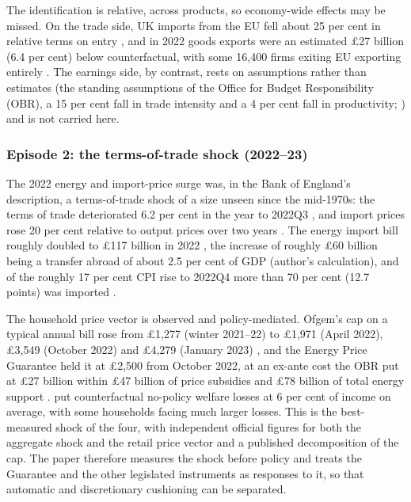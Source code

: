 The identification is relative, across products, so economy-wide
effects may be missed. On the trade side, UK imports from the EU fell
about 25 per cent in relative terms on entry \citep{freeman2022}, and
in 2022 goods exports were an estimated \pounds 27 billion (6.4 per
cent) below counterfactual, with some 16,400 firms exiting EU
exporting entirely \citep{freeman2024}. The earnings side, by
contrast, rests on assumptions rather than estimates (the standing assumptions of the Office for Budget Responsibility
(OBR), a 15 per cent fall in trade intensity and a 4 per cent fall in
productivity; \citealp{obrbrexit}) and is not carried here.



\subsubsection{Episode 2: the terms-of-trade shock (2022--23)}

The 2022 energy and import-price surge was, in the Bank of England's
description, a terms-of-trade shock of a size unseen since the
mid-1970s: the terms of trade deteriorated 6.2 per cent in the year to
2022Q3 \citep{onstot2023}, and import prices rose 20 per cent relative
to output prices over two years \citep{broadbent2022}. The energy
import bill roughly doubled to \pounds 117 billion in 2022
\citep{oeuk2023}, the increase of roughly \pounds 60 billion being a
transfer abroad of about 2.5 per cent of GDP (author's calculation),
and of the roughly 17 per cent CPI rise to 2022Q4 more than 70 per
cent (12.7 points) was imported \citep{dhingrapage2023}.

The household price vector is observed and policy-mediated. Ofgem's
cap on a typical annual bill rose from \pounds 1,277 (winter 2021--22)
to \pounds 1,971 (April 2022), \pounds 3,549 (October 2022) and
\pounds 4,279 (January 2023) \citep{ofgem2021, ofgem2022, ofgemcap2023}, and the
Energy Price Guarantee held it at \pounds 2,500 from
October 2022, at an ex-ante cost the OBR put at \pounds 27 billion
within \pounds 47 billion of price subsidies and \pounds 78 billion of
total energy support \citep{obrenergy2023}. \citet{levell2025} put
counterfactual no-policy welfare losses at 6 per cent of income on
average, with some households facing much larger losses. This is the
best-measured shock of the four, with independent official figures for
both the aggregate shock and the retail price vector and a published
decomposition of the cap. The paper therefore measures the shock
before policy and treats the Guarantee and the other legislated
instruments as responses to it, so that automatic and discretionary
cushioning can be separated.

